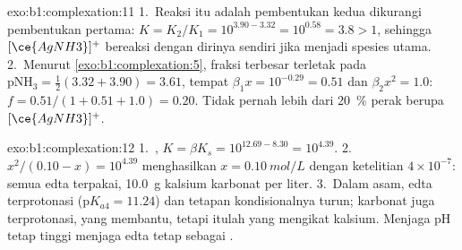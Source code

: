 \begin{solution}{exo:b1:complexation:11}
1.~Reaksi itu adalah pembentukan kedua dikurangi pembentukan pertama:
$K = K_2/K_1 =
10^{3.90 - 3.32} = 10^{0.58} = 3.8 > 1$, sehingga $[\ce{AgNH3}]^{+}$
bereaksi dengan dirinya sendiri jika menjadi spesies utama.
2.~Menurut \cref{exo:b1:complexation:5}, fraksi terbesar terletak pada
$\mathrm{pNH_3} = \frac12(3.32 + 3.90) = 3.61$, tempat $\beta_1 x = 10^{-0.29}
= 0.51$ dan $\beta_2x^2 = 1.0$: $f = 0.51/(1 + 0.51 + 1.0) = 0.20$. Tidak
pernah lebih dari \qty{20}{\percent} perak berupa $[\ce{AgNH3}]^{+}$.
\end{solution}

\begin{solution}{exo:b1:complexation:12}
1.~, $K = \beta K_s = 10^{12.69 -
8.30} = 10^{4.39}$.
2.~$x^2/(0.10 - x) = 10^{4.39}$ menghasilkan $x = \qty{0.10}{mol/L}$
dengan ketelitian $4 \times 10^{-7}$: semua edta terpakai,
\qty{10.0}{g} kalsium karbonat per liter.
3.~Dalam asam, edta terprotonasi ($\mathrm{p}K_{a4} = 11.24$) dan tetapan
kondisionalnya turun; karbonat juga terprotonasi, yang membantu, tetapi
 itulah yang mengikat kalsium. Menjaga pH tetap tinggi menjaga
edta tetap sebagai .
\end{solution}

